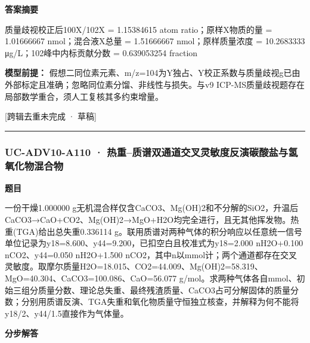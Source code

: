 \documentclass[UTF8,11pt,a4paper]{ctexart}
\begin{document}
\noindent\textbf{答案摘要}\par
质量歧视校正后100X/102X = 1.15384615 atom ratio；原样X物质的量 = 1.01666667 nmol；混合液X总量 = 1.51666667 nmol；原样质量浓度 = 10.2683333 μg/L；102峰中内标贡献分数 = 0.639053254 fraction\par
\noindent\textbf{模型前提：}
假想二同位素元素、m/z=104为Y独占、Y校正系数与质量歧视g已由外部标定且准确；忽略同位素分馏、非线性与损失。与v9 ICP-MS质量歧视题存在局部数学重合，须人工复核其多约束增量。\par
\noindent\textcolor{red!65!black}{[跨辑去重未完成 · 草稿]} \par
\medskip\hrule\medskip
{}
\subsubsection*{UC-ADV10-A110 · 热重–质谱双通道交叉灵敏度反演碳酸盐与氢氧化物混合物}
\noindent\textbf{题目}\par
一份干燥1.000000 g无机混合样仅含CaCO3、Mg(OH)2和不分解的SiO2，升温后CaCO3→CaO+CO2、Mg(OH)2→MgO+H2O均完全进行，且无其他挥发物。热重(TGA)给出总失重0.336114 g。联用质谱对两种气体的积分响应以任意统一信号单位记录为y18=8.600、y44=9.200，已扣空白且校准式为y18=2.000 nH2O+0.100 nCO2、y44=0.050 nH2O+1.500 nCO2，其中n以mmol计；两个通道都存在交叉灵敏度。取摩尔质量H2O=18.015、CO2=44.009、Mg(OH)2=58.319、MgO=40.304、CaCO3=100.086、CaO=56.077 g/mol。求两种气体各自mmol、初始三组分质量分数、理论总失重、最终残渣质量、CaCO3占可分解固体的质量分数；分别用质谱反演、TGA失重和氧化物质量守恒独立核查，并解释为何不能将y18/2、y44/1.5直接作为气体量。\par
\medskip\noindent\textbf{分步解答}
\end{document}
